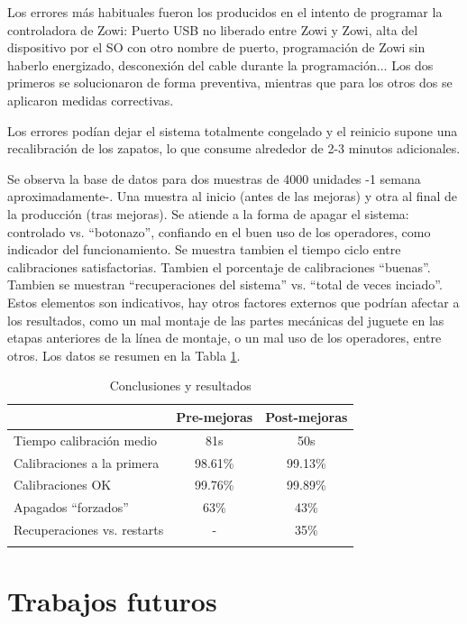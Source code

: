 Los errores más habituales fueron los producidos en el intento de programar la controladora de Zowi: Puerto USB no liberado entre Zowi y Zowi, alta del dispositivo por el SO con otro nombre de puerto, programación de Zowi sin haberlo energizado, desconexión del cable durante la programación... Los dos primeros se solucionaron de forma preventiva, mientras que para los otros dos se aplicaron medidas correctivas.

Los errores podían dejar el sistema totalmente congelado y el reinicio supone una recalibración de los zapatos, lo que consume alrededor de 2-3 minutos adicionales.

Se observa la base de datos para dos muestras de 4000 unidades -1 semana aproximadamente-. Una muestra al inicio (antes de las mejoras) y otra al final de la producción (tras mejoras). Se atiende a la forma de apagar el sistema: controlado vs. ``botonazo'', confiando en el buen uso de los operadores, como indicador del funcionamiento. Se muestra tambien el tiempo ciclo entre calibraciones satisfactorias. Tambien el porcentaje de calibraciones ``buenas''. Tambien se muestran ``recuperaciones del sistema'' vs. ``total de veces inciado''. Estos elementos son indicativos, hay otros factores externos que podrían afectar a los resultados, como un mal montaje de las partes mecánicas del juguete en las etapas anteriores de la línea de montaje, o un mal uso de los operadores, entre otros. Los datos se resumen en la Tabla \ref{tableResults}.

\begin{table}[h]
\centering
\begin{tabular}{l c c}
\toprule
 & \textbf{Pre-mejoras} & \textbf{Post-mejoras} \\
\midrule
Tiempo calibración medio & 81s & 50s \\
Calibraciones a la primera & 98.61\% & 99.13\% \\
Calibraciones OK & 99.76\% & 99.89\% \\
Apagados ``forzados'' & 63\% & 43\% \\
Recuperaciones vs. restarts & - & 35\% \\
\bottomrule\\
\end{tabular}
\caption{Conclusiones y resultados}
\label{tableResults}
\end{table}

\section{Trabajos futuros}

